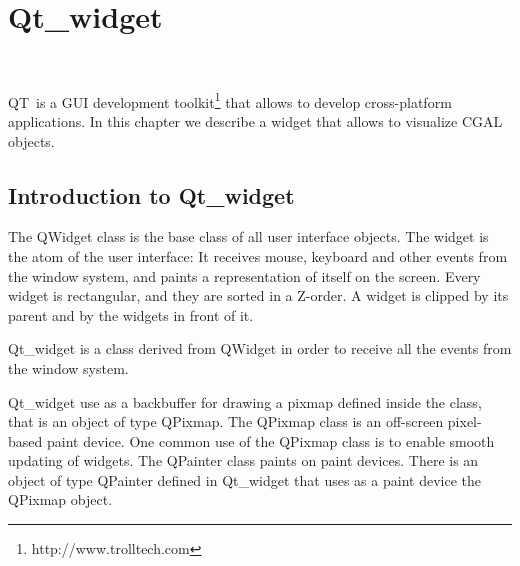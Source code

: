 
\newcommand{\qt}{{\sc QT}}	%

\gdef\lciIfHtmlClassLinks{\lcFalse}
\gdef\lciIfHtmlRefLinks{\lcFalse}
\gdef\lciIfHtmlLinks{\lcFalse}

\chapter{Qt\_widget}
\label{chapterQtwidget}

\\

\qt\ is a GUI development toolkit\footnote{http://www.trolltech.com} that 
allows to develop cross-platform applications. In this chapter we describe a 
widget that allows to visualize CGAL objects.

\section{Introduction to Qt\_widget}
\label{Qt_widget}

The QWidget class is the base class of all user interface objects. The widget
 is the atom of the user interface: It receives mouse, keyboard and other 
events from the window system, and paints a representation of itself on the 
screen. Every widget is rectangular, and they are sorted in a Z-order. A 
widget is clipped by its parent and by the widgets in front of it.

Qt\_widget is a class derived from QWidget in order to receive all the events
from the window system.

Qt\_widget use as a backbuffer for drawing a pixmap
defined inside the class, that is an object of type QPixmap. The QPixmap class
is an off-screen pixel-based paint device. One common use of the QPixmap class
is to enable smooth updating of widgets.
The QPainter class paints on paint devices. There is an object of type 
QPainter defined in Qt\_widget that uses as a paint device the QPixmap object.

